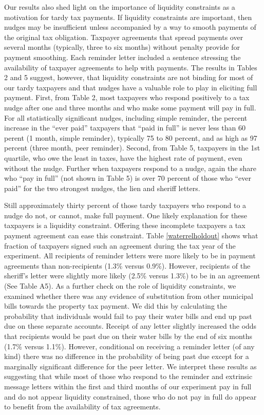 \documentclass[12pt]{article}
\begin{document}
Our results also shed light on the importance of liquidity constraints as a motivation for tardy tax payments. If liquidity constraints are important, then nudges may be insufficient unless accompanied by a way to smooth payments of the original tax obligation. Taxpayer agreements that spread payments over several months (typically, three to six months) without penalty provide for payment smoothing. Each reminder letter included a sentence stressing the availability of taxpayer agreements to help with payments. The results in Tables 2 and 5 suggest, however, that liquidity constraints are not binding for most of our tardy taxpayers and that nudges have a valuable role to play in eliciting full payment. First, from Table 2, most taxpayers who respond positively to a tax nudge after one and three months and who make some payment will pay in full. For all statistically significant nudges, including simple reminder, the percent increase in the ``ever paid'' taxpayers that ``paid in full'' is never less than 60 perent (1 month, simple reminder), typically 75 to 80 percent, and as high as 97 percent (three month, peer reminder). Second, from Table 5, taxpayers in the 1st quartile, who owe the least in taxes, have the highest rate of payment, even without the nudge. Further  when taxpayers respond to a nudge, again the share who ``pay in full'' (not shown in Table 5) is over 70 percent of those who ``ever paid'' for the two strongest nudges, the lien and sheriff letters.

Still approximately thirty percent of those tardy taxpayers who respond to a nudge do not, or cannot, make full payment. One likely explanation for these taxpayers is a liquidity constraint. Offering these incomplete taxpayers a tax payment agreement can ease this constraint. Table \ref{waterrelholdout} shows what fraction of taxpayers signed such an agreement during the tax year of the experiment. All recipients of reminder letters were more likely to
  be in payment agreements than non-recipients (1.3\% versus 0.9\%). However, recipients
  of the sheriff's letter were slightly more likely (2.5\% versus 1.3\%)
  to be in an agreement (See Table A5). As a further check on the role of liquidity constraints, we
  examined whether there was any evidence of substitution from other
  municipal bills towards the property tax payment. We did this by
  calculating the probability that individuals would fail to pay their
  water bills and end up past due on these separate accounts. Receipt
  of any letter slightly increased the odds that recipients would be
  past due on their water bills by the end of six months (1.7\% versus
  1.1\%). However, conditional on receiving a reminder letter (of any
  kind) there was no difference in the probability of being past
  due except for a marginally significant difference for the peer letter.
  We interpret these results as suggesting that while most of those who respond to the reminder and extrinsic message letters within the first and third months of our experiment pay in full and do not appear liquidity constrained, those who do not pay in full do appear to benefit from the availability of tax agreements.
\end{document}
